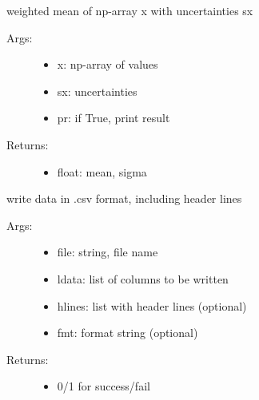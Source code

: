 \documentclass[letterpaper,10pt,english]{sphinxmanual}
\begin{document}
\begin{fulllineitems}
\label{\detokenize{index:PhyPraKit.PhyPraKit.wmean}}
weighted mean of np-array x with uncertainties sx
\begin{description}
\item[{Args:}] \leavevmode\begin{itemize}
\item {} 
x: np-array of values

\item {} 
sx: uncertainties

\item {} 
pr: if True, print result

\end{itemize}

\item[{Returns:}] \leavevmode\begin{itemize}
\item {} 
float: mean, sigma

\end{itemize}

\end{description}

\end{fulllineitems}


\begin{fulllineitems}
\label{\detokenize{index:PhyPraKit.PhyPraKit.writeCSV}}
write data in .csv format, including header lines
\begin{description}
\item[{Args:}] \leavevmode\begin{itemize}
\item {} 
file: string, file name

\item {} 
ldata: list of columns to be written

\item {} 
hlines: list with header lines (optional)

\item {} 
fmt: format string (optional)

\end{itemize}

\item[{Returns: }] \leavevmode\begin{itemize}
\item {} 
0/1  for success/fail

\end{itemize}

\end{description}

\end{fulllineitems}
\end{document}
